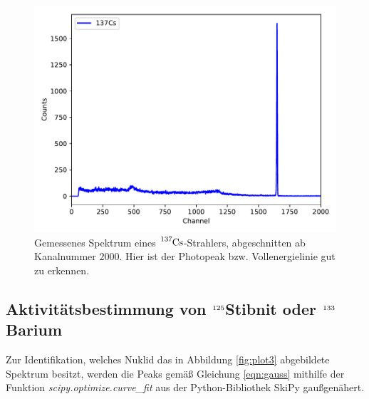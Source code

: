 \begin{figure}[H]
  \centering
  \includegraphics[scale=0.7]{content/plot2.pdf}
  \caption{Gemessenes Spektrum eines $\ce{^{137}Cs}$-Strahlers, abgeschnitten ab Kanalnummer $\num{2000}$. Hier ist der
  Photopeak bzw. Vollenergielinie gut zu erkennen.}
  \label{fig:plot2}
\end{figure}




\subsection{Aktivitätsbestimmung von  $\ce{^{125}}$Stibnit oder  $\ce{^{133}}$Barium }

Zur Identifikation, welches Nuklid das in Abbildung \ref{fig:plot3} abgebildete Spektrum besitzt, werden die Peaks gemäß
Gleichung \eqref{eqn:gauss} mithilfe der Funktion \textit{scipy.optimize.curve\_fit} aus der Python-Bibliothek SkiPy
gaußgenähert.

